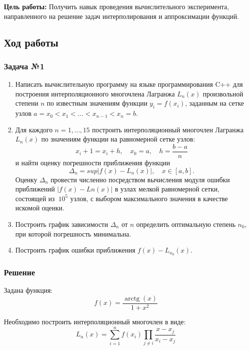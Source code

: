 \documentclass[a4paper, fontsize=14pt]{article}
\begin{document}
\textbf{Цель работы:}  Получить навык проведения вычислительного эксперимента, направленного на решение задач интерполирования и аппроксимации функций.
\subsection*{{Ход работы}}
\subsubsection*{Задача №1}
\begin{enumerate}
   \item	Написать вычислительную программу на языке программирования C++ для построения интерполяционного многочлена Лагранжа $L_n(x)$ произвольной степени $n$ по известным значениям функции $y_i=f(x_i)$, заданным на сетке узлов $a=x_0<x_1<…<x_{n-1}<x_n=b.$
   \item Для каждого $n=1,\dots,15$ построить интерполяционный многочлен Лагранжа $L_n(x)$ по значениям функции на равномерной сетке узлов:
           \begin{equation}
            \label{uniform_grid}
            x_i+1 =x_i+h, \quad  x_0=a,  \quad  h=\frac{b-a}{n}
           \end{equation}
             и найти оценку погрешности приближения функции  
             \begin{equation}
                \label{delta}
                \Delta_n=sup|f(x)-L_n(x)|,  \quad  x \in [a,b].
             \end{equation}
   Оценку $\Delta_n$ провести численно посредством вычисления модуля ошибки приближений $|f(x)-Ln(x)|$ в узлах мелкой равномерной сетки, состоящей из $~10^5$ узлов, с выбором максимального значения в качестве искомой оценки.    
   \item	Построить график зависимости $\Delta_n$ от $n$ определить оптимальную степень $n_0$, при которой погрешность минимальна. 
\item	Построить график ошибки приближения $f(x)-L_{n_0}(x)$.
\end{enumerate}
\subsubsection*{Решение}
Задана функция:
\begin{equation}
    \label{target_f}
    f(x) = \frac{\operatorname{arctg}(x)}{1+x^2}
\end{equation}

Необходимо построить интерполяционный многочлен в виде:
\begin{equation*}
    L_n(x) = \sum_{i=1}^n f(x_i) \prod_{j \neq i} \frac{x-x_j}{x_i-x_j}
\end{equation*} 
\end{document}
